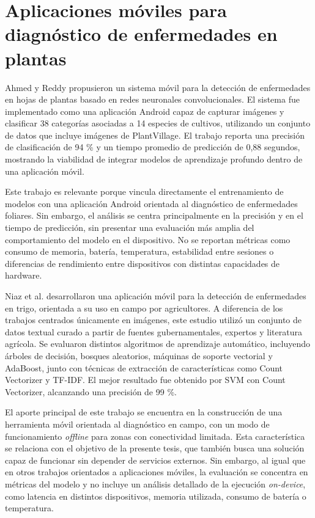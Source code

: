 \section{Aplicaciones móviles para diagnóstico de enfermedades en plantas}

Ahmed y Reddy \cite{ahmed2021mobile} propusieron un sistema móvil para la detección de enfermedades en hojas de plantas basado en redes
neuronales convolucionales. El sistema fue implementado como una aplicación Android capaz de capturar imágenes y clasificar 38 categorías
asociadas a 14 especies de cultivos, utilizando un conjunto de datos que incluye imágenes de PlantVillage. El trabajo reporta una
precisión de clasificación de 94 \% y un tiempo promedio de predicción de 0,88 segundos, mostrando la viabilidad de integrar modelos de
aprendizaje profundo dentro de una aplicación móvil.

Este trabajo es relevante porque vincula directamente el entrenamiento de modelos con una aplicación Android orientada al diagnóstico de
enfermedades foliares. Sin embargo, el análisis se centra principalmente en la precisión y en el tiempo de predicción, sin presentar una
evaluación más amplia del comportamiento del modelo en el dispositivo. No se reportan métricas como consumo de memoria, batería,
temperatura, estabilidad entre sesiones o diferencias de rendimiento entre dispositivos con distintas capacidades de hardware.

Niaz et al. \cite{Niaz2025Efficient} desarrollaron una aplicación móvil para la detección de enfermedades en trigo, orientada a su uso en
campo por agricultores. A diferencia de los trabajos centrados únicamente en imágenes, este estudio utilizó un conjunto de datos textual
curado a partir de fuentes gubernamentales, expertos y literatura agrícola. Se evaluaron distintos algoritmos de aprendizaje automático,
incluyendo árboles de decisión, bosques aleatorios, máquinas de soporte vectorial y AdaBoost, junto con técnicas de extracción de
características como Count Vectorizer y TF-IDF. El mejor resultado fue obtenido por SVM con Count Vectorizer, alcanzando una precisión de
99 \%.

El aporte principal de este trabajo se encuentra en la construcción de una herramienta móvil orientada al diagnóstico en campo, con un modo
de funcionamiento \textit{offline} para zonas con conectividad limitada. Esta característica se relaciona con el objetivo de la presente
tesis, que también busca una solución capaz de funcionar sin depender de servicios externos. Sin embargo, al igual que en otros trabajos
orientados a aplicaciones móviles, la evaluación se concentra en métricas del modelo y no incluye un análisis detallado de la ejecución
\textit{on-device}, como latencia en distintos dispositivos, memoria utilizada, consumo de batería o temperatura.

